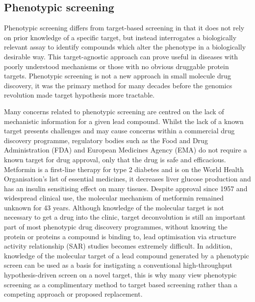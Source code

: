 \documentclass[a4paper,11pt,twoside,openright]{scrbook}
\begin{document}

\subsection{Phenotypic screening}
Phenotypic screening differs from target-based screening in that it does not rely on prior knowledge of a specific target, but instead interrogates a biologically relevant assay to identify compounds which alter the phenotype in a biologically desirable way.
This target-agnostic approach can prove useful in diseases with poorly understood mechanisms or those with no obvious druggable protein targets.
Phenotypic screening is not a new approach in small molecule drug discovery, it was the primary method for many decades before the genomics revolution made target hypothesis more tractable.
\cite{Zheng2013}


Many concerns related to phenotypic screening are centred on the lack of mechanistic information for a given lead compound.
Whilst the lack of a known target presents challenges and may cause concerns within a commercial drug discovery programme, regulatory bodies such as the Food and Drug Administration (FDA) and European Medicines Agency (EMA) do not require a known target for drug approval, only that the drug is safe and efficacious.
Metformin is a first-line therapy for type 2 diabetes and is on the World Health Organisation's list of essential medicines, it decreases liver glucose production and has an insulin sensitising effect on many tissues.
Despite approval since 1957 and widespread clinical use, the  molecular mechanism of metformin remained unknown for 43 years. \cite{Hundal2000}
Although knowledge of the molecular target is not necessary to get a drug into the clinic, target deconvolution is still an important part of most phenotypic drug discovery programmes, without knowing the protein or proteins a compound is binding to, lead optimisation via structure activity relationship (SAR) studies becomes extremely difficult.
In addition, knowledge of the molecular target of a lead compound generated by a phenotypic screen can be used as a basis for instigating a conventional high-throughput hypothesis-driven screen on a novel target, this is why many view phenotypic screening as a complimentary method to target based screening rather than a competing approach or proposed replacement. \cite{Moffat2014}
\end{document}
